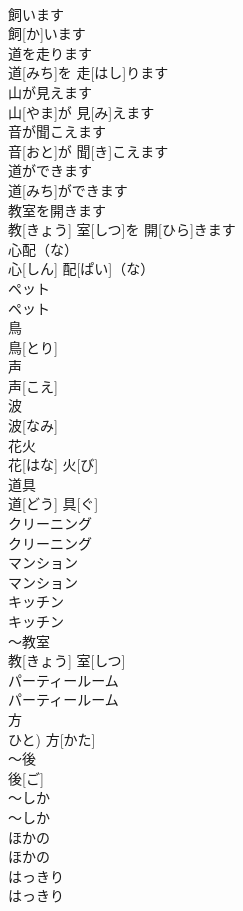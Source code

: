 \documentclass[8pt]{extreport}
\begin{document}
\begin{CJK}{UTF8}{min}
\\	飼います	
\\	飼[か]います		
\\	道を走ります	
\\	道[みち]を 走[はし]ります		
\\	山が見えます	
\\	山[やま]が 見[み]えます		
\\	音が聞こえます	
\\	音[おと]が 聞[き]こえます		
\\	道ができます	
\\	道[みち]ができます		
\\	教室を開きます	
\\	教[きょう] 室[しつ]を 開[ひら]きます		
\\	心配（な）	
\\	心[しん] 配[ぱい]（な）		
\\	ペット	
\\	ペット		
\\	鳥	
\\	鳥[とり]		
\\	声	
\\	声[こえ]		
\\	波	
\\	波[なみ]		
\\	花火	
\\	花[はな] 火[び]		
\\	道具	
\\	道[どう] 具[ぐ]		
\\	クリーニング	
\\	クリーニング		
\\	マンション	
\\	マンション		
\\	キッチン	
\\	キッチン		
\\	～教室	
\\	教[きょう] 室[しつ]		
\\	パーティールーム	
\\	パーティールーム		
\\	方	
\\	ひと)	方[かた]		
\\	～後	
\\	後[ご]		
\\	～しか	
\\	～しか		
\\	ほかの	
\\	ほかの		
\\	はっきり	
\\	はっきり		

\end{CJK}
\end{document}
